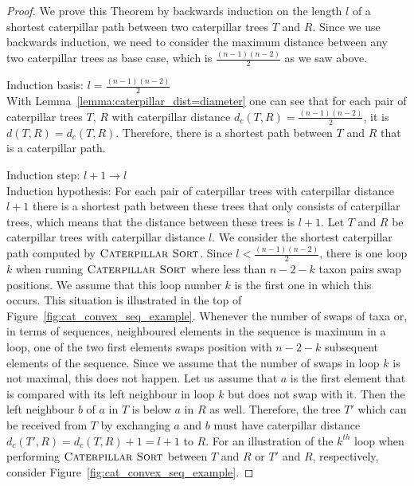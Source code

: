 \documentclass{amsart}
\newcommand{\csort}{\textsc{Caterpillar Sort}}
\begin{document}
\begin{proof}
    We prove this Theorem by backwards induction on the length $l$ of a shortest caterpillar path between two caterpillar trees $T$ and $R$.
    Since we use backwards induction, we need to consider the maximum distance between any two caterpillar trees as base case, which is $\frac{(n-1)(n-2)}{2}$ as we saw above.

    Induction basis: $l = \frac{(n-1)(n-2)}{2}$\\
    With Lemma~\ref{lemma:caterpillar_dist=diameter} one can see that for each pair of caterpillar trees $T$, $R$ with caterpillar distance $d_c(T,R) = \frac{(n-1)(n-2)}{2}$, it is $d(T,R) = d_c(T,R)$.
    Therefore, there is a shortest path between $T$ and $R$ that is a caterpillar path.

    Induction step: $l+1 \to l$\\
    Induction hypothesis: For each pair of caterpillar trees with caterpillar distance $l+1$ there is a shortest path between these trees that only consists of caterpillar trees, which means that the distance between these trees is $l+1$.
    Let $T$ and $R$ be caterpillar trees with caterpillar distance $l$.
    We consider the shortest caterpillar path computed by $\csort$.
    Since $l < \frac{(n-1)(n-2)}{2}$, there is one loop $k$ when running $\csort$ where less than $n-2-k$ taxon pairs swap positions.
    We assume that this loop number $k$ is the first one in which this occurs.
    This situation is illustrated in the top of Figure~\ref{fig:cat_convex_seq_example}.
    Whenever the number of swaps of taxa or, in terms of sequences, neighboured elements in the sequence is maximum in a loop, one of the two first elements swaps position with $n-2-k$ subsequent elements of the sequence.
    Since we assume that the number of swaps in loop $k$ is not maximal, this does not happen.
    Let us assume that $a$ is the first element that is compared with its left neighbour in loop $k$ but does not swap with it.
    Then the left neighbour $b$ of $a$ in $T$ is below $a$ in $R$ as well.
    Therefore, the tree $T'$ which can be received from $T$ by exchanging $a$ and $b$ must have caterpillar distance $d_c(T',R) = d_c(T,R) + 1 = l + 1$ to $R$.
    For an illustration of the $k^{th}$ loop when performing $\csort$ between $T$ and $R$ or $T'$ and $R$, respectively, consider Figure~\ref{fig:cat_convex_seq_example}.


\end{proof}
\end{document}
